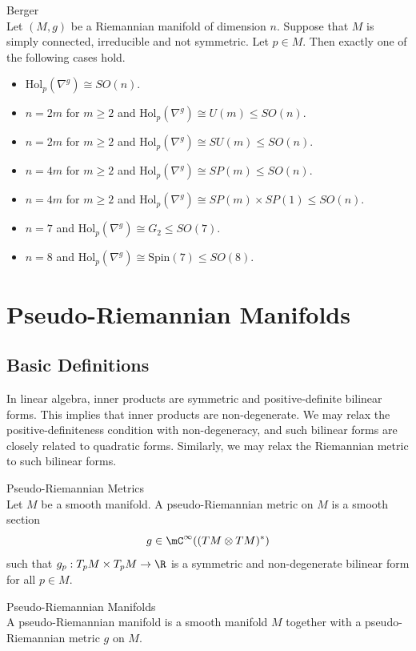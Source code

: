 \documentclass[a4paper]{article}
\begin{document}
\begin{thm}{Berger}{}\\
Let $(M,g)$ be a Riemannian manifold of dimension $n$. Suppose that $M$ is simply connected, irreducible and not symmetric. Let $p\in M$. Then exactly one of the following cases hold. 
\begin{itemize}
\item $\text{Hol}_p(\nabla^g)\cong SO(n)$. 
\item $n=2m$ for $m\geq 2$ and $\text{Hol}_p(\nabla^g)\cong U(m)\leq SO(n)$. 
\item $n=2m$ for $m\geq 2$ and $\text{Hol}_p(\nabla^g)\cong SU(m)\leq SO(n)$. 
\item $n=4m$ for $m\geq 2$ and $\text{Hol}_p(\nabla^g)\cong SP(m)\leq SO(n)$. 
\item $n=4m$ for $m\geq 2$ and $\text{Hol}_p(\nabla^g)\cong SP(m)\times SP(1)\leq SO(n)$. 
\item $n=7$ and $\text{Hol}_p(\nabla^g)\cong G_2\leq SO(7)$. 
\item $n=8$ and $\text{Hol}_p(\nabla^g)\cong\text{Spin}(7)\leq SO(8)$. 
\end{itemize}
\end{thm}

\pagebreak
\section{Pseudo-Riemannian Manifolds}
\subsection{Basic Definitions}
In linear algebra, inner products are symmetric and positive-definite bilinear forms. This implies that inner products are non-degenerate. We may relax the positive-definiteness condition with non-degeneracy, and such bilinear forms are closely related to quadratic forms. Similarly, we may relax the Riemannian metric to such bilinear forms. 

\begin{defn}{Pseudo-Riemannian Metrics}{}\\
Let $M$ be a smooth manifold. A pseudo-Riemannian metric on $M$ is a smooth section $$g\in\mC^\infty((TM\otimes TM)^\ast)$$ such that $g_p:T_pM\times T_pM\to\R$ is a symmetric and non-degenerate bilinear form for all $p\in M$. 
\end{defn}

\begin{defn}{Pseudo-Riemannian Manifolds}{}\\
A pseudo-Riemannian manifold is a smooth manifold $M$ together with a pseudo-Riemannian metric $g$ on $M$. 
\end{defn}
\end{document}
